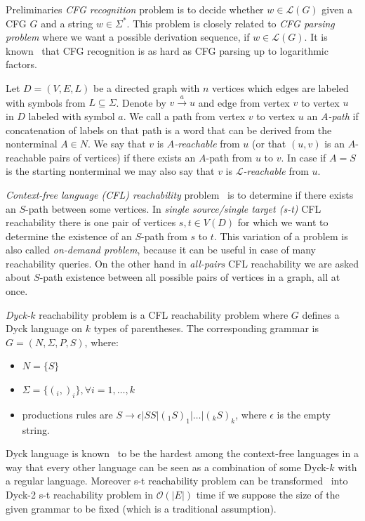 \documentclass[12pt]{article}
\begin{document}
\begin{section}{Preliminaries}
	\emph{CFG recognition} problem is to decide whether $w \in \mathcal{L}(G)$ given a CFG $G$ and a string $w \in \Sigma^*$. This problem is closely related to \emph{CFG parsing problem} where we want a possible derivation sequence, if $w \in \mathcal{L}(G)$. It is known~\cite{10.5555/646233.682379} that CFG recognition is as hard as CFG parsing up to logarithmic factors. 
	
	Let $D = (V, E, L)$ be a directed graph with $n$ vertices which edges are labeled with symbols from $L \subseteq \Sigma$. Denote by $v \xrightarrow{a} u$ and edge from vertex $v$ to vertex $u$ in $D$ labeled with symbol $a$. We call a path from vertex $v$ to vertex $u$ an \textit{$A$-path} if concatenation of labels on that path is a word that can be derived from the nonterminal $A \in N$. We say that $v$ is \textit{$A$-reachable} from $u$ (or that $(u, v)$ is an $A$-reachable pairs of vertices) if there exists an $A$-path from $u$ to $v$. In case if $A = S$ is the starting nonterminal we may also say that $v$ is \textit{$\mathcal{L}$-reachable} from $u$.
	
	\emph{Context-free language (CFL) reachability} problem~\cite{REPS1998701} is to determine if there exists an $S$-path between some vertices. In \emph{single source/single target (s-t)} CFL reachability there is one pair of vertices $s, t \in V(D)$ for which we want to determine the existence of an $S$-path from $s$ to $t$. This variation of a problem is also called \emph{on-demand problem}, because it can be useful in case of many reachability queries. On the other hand in  \emph{all-pairs} CFL reachability we are asked about $S$-path existence between all possible pairs of vertices in a graph, all at once. 
	
	\emph{Dyck-$k$} reachability problem is a CFL reachability problem where $G$ defines a Dyck language on $k$ types of parentheses. The corresponding grammar is $G=(N, \Sigma, P, S)$, where:

	\begin{itemize}
	    \item $N = \{S\}$
	    \item $\Sigma = \{(_i, )_i\}, \forall i = 1, \ldots, k$
	    \item productions rules are $S \rightarrow \epsilon | SS | (_1 S )_1 | \ldots | (_k S )_k$, where $\epsilon$ is the empty string. 
	\end{itemize}
	
	Dyck language is known~\cite{ch-sch} to be the hardest among the context-free languages in a way that every other language can be seen as a combination of some Dyck-$k$ with a regular language. Moreover s-t reachability problem can be transformed~\cite{schepper2018complexity} into Dyck-2 s-t reachability problem in $\mathcal{O}(|E|)$ time if we suppose the size of the given grammar to be fixed (which is a traditional assumption).
	

\end{section}
\end{document}
